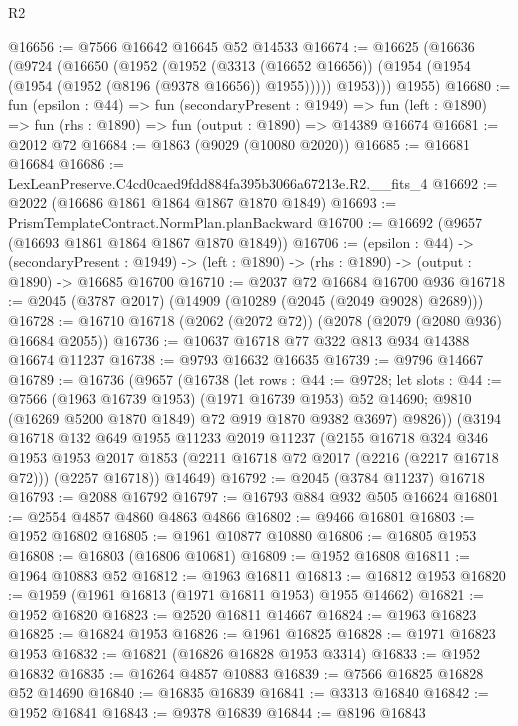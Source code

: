 \begin{lexlean}{R2}
\begin{coremodule}
@16656 := @7566 @16642 @16645 @52 @14533
@16674 := @16625
    (@16636
      (@9724
        (@16650
          (@1952
            (@1952
              (@3313 (@16652 @16656))
              (@1954 (@1954 (@1954 (@1952 (@8196 (@9378 @16656)) @1955)))))
            @1953)))
      @1955)
@16680 := fun (epsilon : @44) =>
  fun (secondaryPresent : @1949) =>
  fun (left : @1890) => fun (rhs : @1890) => fun (output : @1890) => @14389 @16674
@16681 := @2012 @72
@16684 := @1863 (@9029 (@10080 @2020))
@16685 := @16681 @16684
@16686 := LexLeanPreserve.C4cd0caed9fdd884fa395b3066a67213e.R2.__fits_4
@16692 := @2022 (@16686 @1861 @1864 @1867 @1870 @1849)
@16693 := PrismTemplateContract.NormPlan.planBackward
@16700 := @16692 (@9657 (@16693 @1861 @1864 @1867 @1870 @1849))
@16706 := (epsilon : @44) ->
  (secondaryPresent : @1949) -> (left : @1890) -> (rhs : @1890) -> (output : @1890) -> @16685 @16700
@16710 := @2037 @72 @16684 @16700 @936
@16718 := @2045 (@3787 @2017) (@14909 (@10289 (@2045 (@2049 @9028) @2689)))
@16728 := @16710 @16718 (@2062 (@2072 @72)) (@2078 (@2079 (@2080 @936) @16684 @2055))
@16736 := @10637 @16718 @77 @322 @813 @934 @14388 @16674 @11237
@16738 := @9793 @16632 @16635
@16739 := @9796 @14667
@16789 := @16736
    (@9657
      (@16738
        (let rows : @44 := @9728;
        let slots : @44 := @7566 (@1963 @16739 @1953) (@1971 @16739 @1953) @52 @14690;
        @9810 (@16269 @5200 @1870 @1849) @72 @919 @1870 @9382 @3697)
        @9826))
    (@3194
      @16718
      @132
      @649
      @1955
      @11233
      @2019
      @11237
      (@2155
        @16718
        @324
        @346
        @1953
        @1953
        @2017
        @1853
        (@2211 @16718 @72 @2017 (@2216 (@2217 @16718 @72)))
        (@2257 @16718))
      @14649)
@16792 := @2045 (@3784 @11237) @16718
@16793 := @2088 @16792
@16797 := @16793 @884 @932 @505 @16624
@16801 := @2554 @4857 @4860 @4863 @4866
@16802 := @9466 @16801
@16803 := @1952 @16802
@16805 := @1961 @10877 @10880
@16806 := @16805 @1953
@16808 := @16803 (@16806 @10681)
@16809 := @1952 @16808
@16811 := @1964 @10883 @52
@16812 := @1963 @16811
@16813 := @16812 @1953
@16820 := @1959 (@1961 @16813 (@1971 @16811 @1953) @1955 @14662)
@16821 := @1952 @16820
@16823 := @2520 @16811 @14667
@16824 := @1963 @16823
@16825 := @16824 @1953
@16826 := @1961 @16825
@16828 := @1971 @16823 @1953
@16832 := @16821 (@16826 @16828 @1953 @3314)
@16833 := @1952 @16832
@16835 := @16264 @4857 @10883
@16839 := @7566 @16825 @16828 @52 @14690
@16840 := @16835 @16839
@16841 := @3313 @16840
@16842 := @1952 @16841
@16843 := @9378 @16839
@16844 := @8196 @16843

\end{coremodule}
\end{lexlean}
